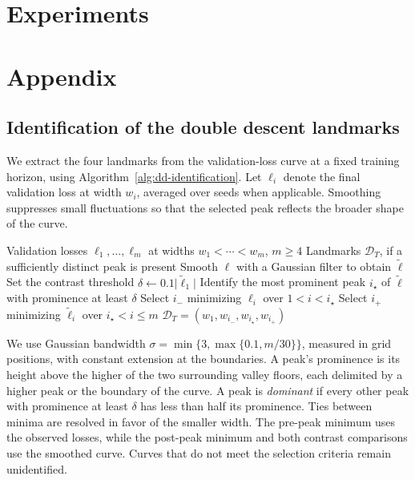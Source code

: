 \documentclass[10pt]{article} %
\begin{document}
\section{Experiments}

\clearpage




\clearpage

\appendix

\section{Appendix}

\subsection{Identification of the double descent landmarks}
\label{ap:dd-identification}

We extract the four landmarks from the validation-loss curve at a fixed
training horizon, using Algorithm~\ref{alg:dd-identification}. Let
$\ell_i$ denote the final validation loss at width $w_i$, averaged over
seeds when applicable. Smoothing suppresses small fluctuations so that
the selected peak reflects the broader shape of the curve.

\begin{algorithm}[htbp]
\caption{Four-point identification of double descent}
\label{alg:dd-identification}
\begin{algorithmic}[1]
\Require Validation losses $\ell_1,\ldots,\ell_m$ at widths $w_1<\cdots<w_m$, $m\geq4$
\Ensure Landmarks $\mathcal{D}_T$, if a sufficiently distinct peak is present
\State Smooth $\ell$ with a Gaussian filter to obtain $\widetilde\ell$
\State Set the contrast threshold $\delta\gets 0.1\lvert\widetilde\ell_1\rvert$
\State Identify the most prominent peak $i_\star$ of $\widetilde\ell$ with prominence at least $\delta$
    \State Select $i_-$ minimizing $\ell_i$ over $1<i<i_\star$
    \State Select $i_+$ minimizing $\widetilde\ell_i$ over $i_\star<i\leq m$
        \State \Return $\mathcal{D}_T=(w_1,w_{i_-},w_{i_\star},w_{i_+})$
    \EndIf
\EndIf
\end{algorithmic}
\end{algorithm}

We use Gaussian bandwidth $\sigma=\min\{3,\max\{0.1,m/30\}\}$,
measured in grid positions, with constant extension at the boundaries.
A peak's prominence is its height above the higher of the two surrounding
valley floors, each delimited by a higher peak or the boundary of the
curve. A peak is \emph{dominant} if every other peak with prominence at
least $\delta$ has less than half its prominence. Ties between minima
are resolved in favor of the smaller width. The pre-peak minimum uses
the observed losses, while the post-peak minimum and both contrast
comparisons use the smoothed curve. Curves that do not meet the selection
criteria remain unidentified.
\end{document}
